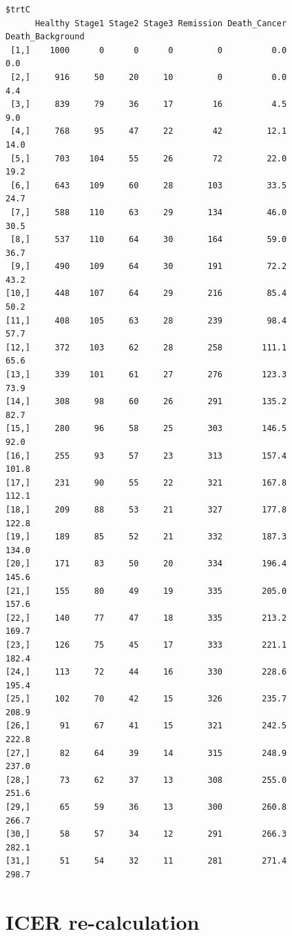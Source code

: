 \documentclass[
  letterpaper,
  DIV=11,
  numbers=noendperiod]{scrartcl}
\begin{document}
\begin{verbatim}
$trtC
      Healthy Stage1 Stage2 Stage3 Remission Death_Cancer Death_Background
 [1,]    1000      0      0      0         0          0.0              0.0
 [2,]     916     50     20     10         0          0.0              4.4
 [3,]     839     79     36     17        16          4.5              9.0
 [4,]     768     95     47     22        42         12.1             14.0
 [5,]     703    104     55     26        72         22.0             19.2
 [6,]     643    109     60     28       103         33.5             24.7
 [7,]     588    110     63     29       134         46.0             30.5
 [8,]     537    110     64     30       164         59.0             36.7
 [9,]     490    109     64     30       191         72.2             43.2
[10,]     448    107     64     29       216         85.4             50.2
[11,]     408    105     63     28       239         98.4             57.7
[12,]     372    103     62     28       258        111.1             65.6
[13,]     339    101     61     27       276        123.3             73.9
[14,]     308     98     60     26       291        135.2             82.7
[15,]     280     96     58     25       303        146.5             92.0
[16,]     255     93     57     23       313        157.4            101.8
[17,]     231     90     55     22       321        167.8            112.1
[18,]     209     88     53     21       327        177.8            122.8
[19,]     189     85     52     21       332        187.3            134.0
[20,]     171     83     50     20       334        196.4            145.6
[21,]     155     80     49     19       335        205.0            157.6
[22,]     140     77     47     18       335        213.2            169.7
[23,]     126     75     45     17       333        221.1            182.4
[24,]     113     72     44     16       330        228.6            195.4
[25,]     102     70     42     15       326        235.7            208.9
[26,]      91     67     41     15       321        242.5            222.8
[27,]      82     64     39     14       315        248.9            237.0
[28,]      73     62     37     13       308        255.0            251.6
[29,]      65     59     36     13       300        260.8            266.7
[30,]      58     57     34     12       291        266.3            282.1
[31,]      51     54     32     11       281        271.4            298.7
\end{verbatim}

\hypertarget{icer-re-calculation}{%
\section{ICER re-calculation}\label{icer-re-calculation}}
\end{document}
